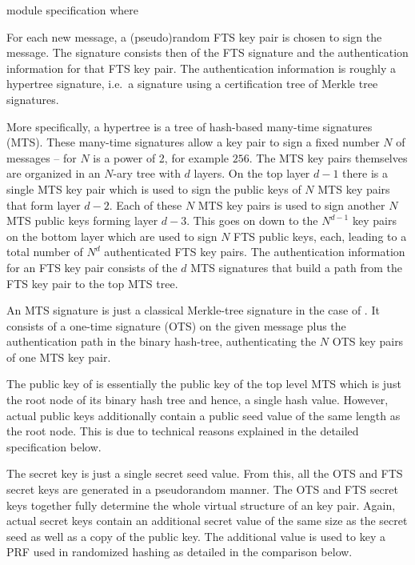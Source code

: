 \begin{code}
  module specification where
\end{code}

For each new message, a (pseudo)random FTS key pair is chosen to sign the message.
The signature consists then of the FTS signature and the authentication
information for that FTS key pair. The authentication information is roughly a
hypertree signature, i.e.~a signature using a certification tree of Merkle tree
signatures.

More specifically, a hypertree is a tree of hash-based many-time signatures (MTS).
These many-time signatures allow a key pair to sign a fixed number $N$ of
messages -- for \spx $N$ is a power of 2, for example $256$. The MTS
key pairs themselves are organized in an $N$-ary tree with $d$ layers. On the
top layer $d-1$ there is a single MTS key pair which is used to sign the public keys of
$N$ MTS key pairs that form layer $d-2$. Each of these $N$ MTS key pairs is used
to sign another $N$ MTS public keys forming layer $d-3$. This goes on down to the
$N^{d-1}$ key pairs on the bottom layer which are used to sign $N$ FTS public
keys, each, leading to a total number of $N^d$ authenticated FTS key pairs. The
authentication information for an FTS key pair consists of the $d$ MTS
signatures that build a path from the FTS key pair to the top MTS tree.

An MTS signature is just a classical Merkle-tree signature in the case of \spx.
It consists of a one-time signature (OTS) on the given message plus the authentication
path in the binary hash-tree, authenticating the $N$ OTS key pairs of one MTS key
pair.

The public key of \spx is essentially the public key of the top level MTS which
is just the root node of its binary hash tree and hence, a single hash value.
However, actual \spx public keys additionally contain a public seed value of the
same length as the root node. This is due to technical reasons explained in the
detailed specification below.

The \spx secret key is just a single secret seed value. From this, all the OTS
and FTS secret keys are generated in a pseudorandom manner. The OTS and FTS
secret keys together fully determine the whole virtual structure of an \spx
key pair. Again, actual \spx secret keys contain an additional secret value of
the same size as the secret seed as well as a copy of the public key. The
additional value is used to key a PRF
used in randomized hashing as detailed in the comparison below.

